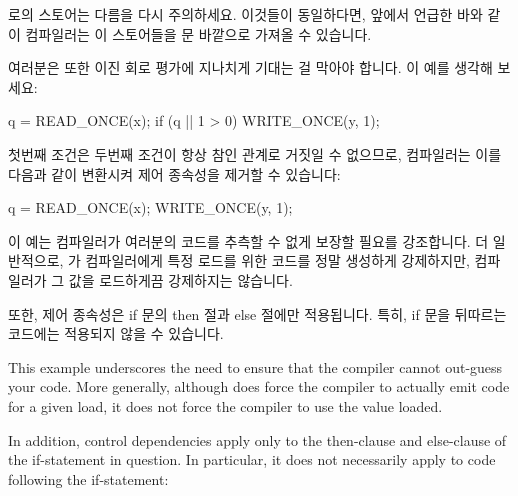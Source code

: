  로의 스토어는 다름을 다시 주의하세요.
이것들이 동일하다면, 앞에서 언급한 바와 같이 컴파일러는 이 스토어들을 
문 바깥으로 가져올 수 있습니다.

여러분은 또한 이진 회로 평가에 지나치게 기대는 걸 막아야 합니다.
이 예를 생각해 보세요:

\begin{VerbatimN}
q = READ_ONCE(x);
if (q || 1 > 0)
	WRITE_ONCE(y, 1);
\end{VerbatimN}

첫번째 조건은 두번째 조건이 항상 참인 관계로 거짓일 수 없으므로, 컴파일러는
이를 다음과 같이 변환시켜 제어 종속성을 제거할 수 있습니다:

\begin{VerbatimN}
q = READ_ONCE(x);
WRITE_ONCE(y, 1);
\end{VerbatimN}

이 예는 컴파일러가 여러분의 코드를 추측할 수 없게 보장할 필요를 강조합니다.
더 일반적으로,  가 컴파일러에게 특정 로드를 위한 코드를 정말
생성하게 강제하지만, 컴파일러가 그 값을 로드하게끔 강제하지는 않습니다.

또한, 제어 종속성은 if 문의 then 절과 else 절에만 적용됩니다.
특히, if 문을 뒤따르는 코드에는 적용되지 않을 수 있습니다.

\iffalse

This example underscores the need to ensure that the compiler cannot
out-guess your code.
More generally, although  does force
the compiler to actually emit code for a given load, it does not force
the compiler to use the value loaded.

In addition, control dependencies apply only to the then-clause and
else-clause of the if-statement in question.
In particular, it does
not necessarily apply to code following the if-statement:

